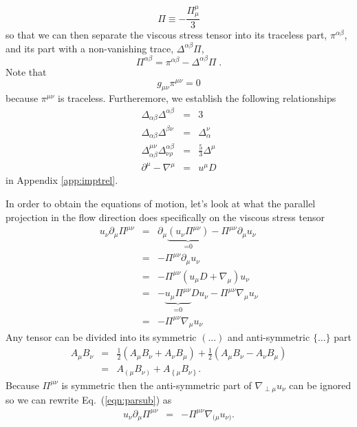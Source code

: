 \documentclass[aps,article]{revtex4}
\begin{document}
\begin{equation}
\Pi\equiv -\frac{\Pi^{\mu}_{\mu}}{3}
\end{equation}
so that we can then separate the viscous stress tensor into its traceless part, $\pi^{\alpha\beta}$, and its part with a non-vanishing trace, $\Delta^{\alpha\beta}\Pi$,
\begin{equation}\label{eqn:pisep}
\boxed{\Pi^{\alpha\beta}=\pi^{\alpha\beta}-\Delta^{\alpha\beta}\Pi}\;.
\end{equation}
Note that
\begin{equation}
g_{\mu\nu}\pi^{\mu\nu}=0
\end{equation}
because $\pi^{\mu\nu}$ is traceless.
Furtheremore, we establish the following relationships 
\begin{eqnarray}
\Delta_{\alpha\beta}\Delta^{\alpha\beta}&=&3\label{eqn:pf1}\\
\Delta_{\alpha\beta}\Delta^{\beta\nu}&=&\Delta_{\alpha}^{\nu}\label{eqn:pf2}\\
\Delta^{\mu\nu}_{\alpha\beta}\Delta_{\nu\rho}^{\alpha\beta}&=&\frac{5}{3}\Delta^{\mu}\label{eqn:pf3}\\
\partial^{\mu}-\nabla^{\mu}&=&u^{\mu}D\label{eqn:pf4}
\end{eqnarray}
 in Appendix \ref{app:imptrel}.


In order to obtain the equations of motion,  let's look at what the parallel projection in the flow direction does specifically on the viscous stress tensor
\begin{eqnarray}
u_{\nu}\partial_{\mu}\Pi^{\mu\nu}&=&\partial_{\mu}\underbrace{\left(u_{\nu}\Pi^{\mu\nu}\right)}_\textrm{=0}-\Pi^{\mu\nu}\partial_{\mu}u_{\nu}\nonumber\\
&=&-\Pi^{\mu\nu}\partial_{\mu}u_{\nu}\nonumber\\
&=&-\Pi^{\mu\nu}\left(u_{\mu}D+\nabla_{\mu}\right)u_{\nu}\nonumber\\
&=&-\underbrace{u_{\mu}\Pi^{\mu\nu}}_\textrm{=0}Du_{\nu}-\Pi^{\mu\nu}\nabla_{\mu}u_{\nu}\nonumber\\
&=&-\Pi^{\mu\nu}\nabla_{\mu}u_{\nu}\label{eqn:parsub}
\end{eqnarray}
Any tensor can be divided into its symmetric $(\dots)$ and anti-symmetric $\{\dots\}$ part
\begin{eqnarray}\label{eqn:symnanti}
A_{\mu}B_{\nu}&=&\frac{1}{2}\left(A_{\mu}B_{\nu}+A_{\nu}B_{\mu}\right)+\frac{1}{2}\left(A_{\mu}B_{\nu}-A_{\nu}B_{\mu}\right)\nonumber\\
&=&A_{\left(\mu\right.}B_{\left.\nu\right)}+A_{\left\{\mu\right.}B_{\left.\nu\right\}}.
\end{eqnarray}
Because $\Pi^{\mu\nu}$ is symmetric then the anti-symmetric part of $\nabla_{\perp\mu}u_{\nu}$ can be ignored so we can rewrite Eq.\ (\ref{eqn:parsub}) as
\begin{eqnarray}
u_{\nu}\partial_{\mu}\Pi^{\mu\nu}&=&-\Pi^{\mu\nu}\nabla_{(\mu}u_{\nu)}\label{eqn:parsub2}.
\end{eqnarray}
\end{document}
